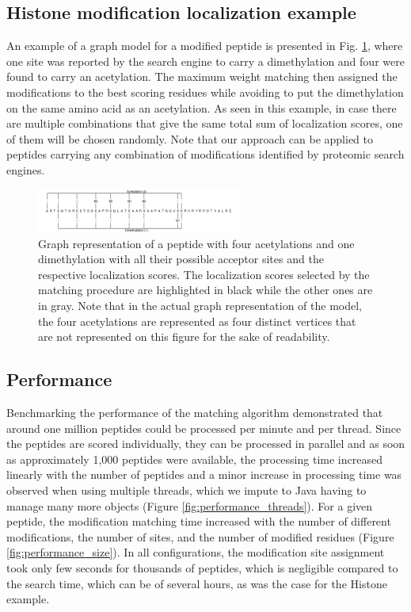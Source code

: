 \documentclass[]{article}
\begin{document}
\subsection{Histone modification localization example}


 An example of a graph model for a modified peptide is presented in Fig. \ref{fig:histone_peptide}, where one site was reported by the search engine to carry a dimethylation and four were found to carry an acetylation. The maximum weight matching then assigned the modifications to the best scoring residues while avoiding to put the dimethylation on the same amino acid as an acetylation. As seen in this example, in case there are multiple combinations that give the same total sum of localization scores,  one of them will be chosen randomly. Note that our approach can be applied to peptides carrying any combination of modifications identified by proteomic search engines.
 
 \begin{figure}[!tpb]
 	\centerline{\includegraphics[width=0.6\textwidth]{figures/figure_histone.png}}
 	\caption{Graph representation of a peptide with four acetylations and one dimethylation with all their possible acceptor sites and the respective localization scores. The localization scores selected by the matching procedure are highlighted in black while the other ones are in gray. Note that in the actual graph representation of the model, the four acetylations are represented as four distinct vertices that are not represented on this figure for the sake of readability.}\label{fig:histone_peptide}
 \end{figure}
 

\subsection{Performance}

Benchmarking the performance of the matching algorithm demonstrated that around one million peptides could be processed per minute and per thread. Since the peptides are scored individually, they can be processed in parallel and as soon as approximately 1,000 peptides were available, the processing time increased linearly with the number of peptides and a minor increase in processing time was observed when using multiple threads, which we impute to Java having to manage many more objects (Figure \ref{fig:performance_threads}). For a given peptide, the modification matching time increased with the number of different modifications, the number of sites, and the number of modified residues (Figure \ref{fig:performance_size}). In all configurations, the modification site assignment took only few seconds for thousands of peptides, which is negligible compared to the search time, which can be of several hours, as was the case for the Histone example.
\end{document}
